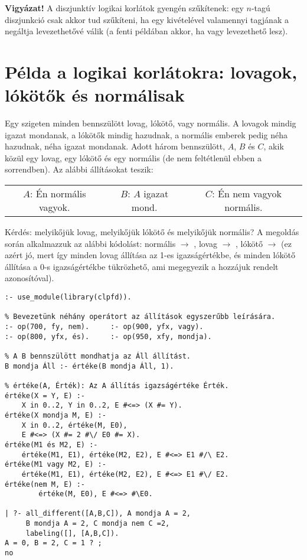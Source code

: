 {\bf Vigyázat!} A diszjunktív logikai korlátok gyengén szűkítenek: egy $n$-tagú
diszjunkció csak akkor tud szűkíteni, ha egy kivételével valamennyi tagjának a
negáltja levezethetővé válik (a fenti példában akkor, ha  vagy 
levezethető lesz).

\section{Példa a logikai korlátokra: lovagok, lókötők és normálisak}

Egy szigeten minden bennszülött lovag, lókötő, vagy normális. A lovagok mindig
igazat mondanak, a lókötők mindig hazudnak, a normális emberek pedig néha
hazudnak, néha igazat mondanak. Adott három bennszülött, $A$, $B$ és $C$, akik
közül egy lovag, egy lókötő és egy normális (de nem feltétlenül ebben a sorrendben).
Az alábbi állításokat teszik:

\begin{center}\begin{tabular}{ccc}
$A$: Én normális vagyok. & $B$: $A$ igazat mond. & $C$: Én nem vagyok normális.
\end{tabular}\end{center}

Kérdés: melyikőjük lovag, melyikőjük lókötő és melyikőjük normális?
\br
A \clpfd megoldás során alkalmazzuk az alábbi kódolást: normális $\to$ ,
lovag $\to$ , lókötő $\to$  (ez azért jó, mert így minden lovag
állítása az 1-es igazságértékbe, és minden lókötő állítása a 0-s igazságértékbe
tükrözhető, ami megegyezik a hozzájuk rendelt azonosítóval).

\begin{verbatim}
:- use_module(library(clpfd)).

% Bevezetünk néhány operátort az állítások egyszerűbb leírására.
:- op(700, fy, nem).     :- op(900, yfx, vagy).  
:- op(800, yfx, és).     :- op(950, xfy, mondja).

% A B bennszülött mondhatja az Áll állítást.
B mondja Áll :- értéke(B mondja Áll, 1).

% értéke(A, Érték): Az A állítás igazságértéke Érték.
értéke(X = Y, E) :-
    X in 0..2, Y in 0..2, E #<=> (X #= Y).
értéke(X mondja M, E) :-
    X in 0..2, értéke(M, E0), 
    E #<=> (X #= 2 #\/ E0 #= X).
értéke(M1 és M2, E) :-
    értéke(M1, E1), értéke(M2, E2), E #<=> E1 #/\ E2.
értéke(M1 vagy M2, E) :-
    értéke(M1, E1), értéke(M2, E2), E #<=> E1 #\/ E2.
értéke(nem M, E) :-
        értéke(M, E0), E #<=> #\E0.

| ?- all_different([A,B,C]), A mondja A = 2, 
     B mondja A = 2, C mondja nem C =2,
     labeling([], [A,B,C]).
A = 0, B = 2, C = 1 ? ;
no
\end{verbatim}

